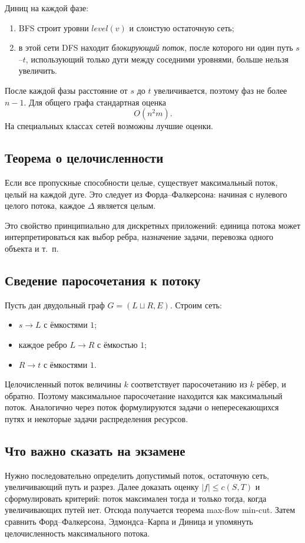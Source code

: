 Диниц на каждой фазе:
\begin{enumerate}
 \item BFS строит уровни $level(v)$ и слоистую остаточную сеть;
 \item в этой сети DFS находит \emph{блокирующий поток}, после которого ни один
       путь $s$--$t$, использующий только дуги между соседними уровнями, больше
       нельзя увеличить.
\end{enumerate}
После каждой фазы расстояние от $s$ до $t$ увеличивается, поэтому фаз не более
$n-1$. Для общего графа стандартная оценка
\[
    O(n^2m).
\]
На специальных классах сетей возможны лучшие оценки.

\subsection{Теорема о целочисленности}

Если все пропускные способности целые, существует максимальный поток, целый на
каждой дуге. Это следует из Форда--Фалкерсона: начиная с нулевого целого потока,
каждое $\Delta$ является целым.

Это свойство принципиально для дискретных приложений: единица потока может
интерпретироваться как выбор ребра, назначение задачи, перевозка одного объекта и
т.~п.

\subsection{Сведение паросочетания к потоку}

Пусть дан двудольный граф $G=(L\sqcup R,E)$. Строим сеть:
\begin{itemize}
 \item $s\to L$ с ёмкостями $1$;
 \item каждое ребро $L\to R$ с ёмкостью $1$;
 \item $R\to t$ с ёмкостями $1$.
\end{itemize}
Целочисленный поток величины $k$ соответствует паросочетанию из $k$ рёбер, и
обратно. Поэтому максимальное паросочетание находится как максимальный поток.
Аналогично через поток формулируются задачи о непересекающихся путях и некоторые
задачи распределения ресурсов.

\subsection{Что важно сказать на экзамене}

Нужно последовательно определить допустимый поток, остаточную сеть, увеличивающий
путь и разрез. Далее доказать оценку $|f|\le c(S,T)$ и сформулировать критерий:
поток максимален тогда и только тогда, когда увеличивающих путей нет. Отсюда
получается теорема max-flow min-cut. Затем сравнить Форд--Фалкерсона,
Эдмондса--Карпа и Диница и упомянуть целочисленность максимального потока.

\newpage
